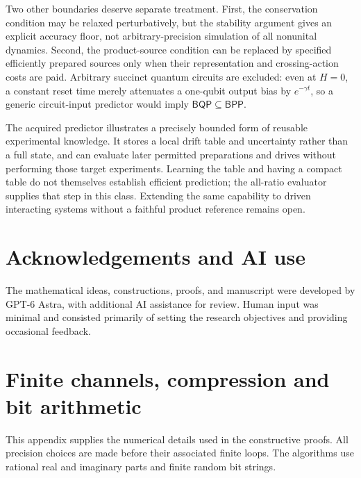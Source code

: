\documentclass[11pt,reqno]{amsart}
\numberwithin{equation}{section}
\theoremstyle{definition}
\theoremstyle{remark}
\begin{document}
Two other boundaries deserve separate treatment. First, the conservation condition may be relaxed perturbatively, but the stability argument gives an explicit accuracy floor, not arbitrary-precision simulation of all nonunital dynamics. Second, the product-source condition can be replaced by specified efficiently prepared sources only when their representation and crossing-action costs are paid. Arbitrary succinct quantum circuits are excluded: even at $H=0$, a constant reset time merely attenuates a one-qubit output bias by $e^{-\gamma t}$, so a generic circuit-input predictor would imply $\mathsf{BQP}\subseteq\mathsf{BPP}$.

The acquired predictor illustrates a precisely bounded form of reusable experimental knowledge. It stores a local drift table and uncertainty rather than a full state, and can evaluate later permitted preparations and drives without performing those target experiments. Learning the table and having a compact table do not themselves establish efficient prediction; the all-ratio evaluator supplies that step in this class. Extending the same capability to driven interacting systems without a faithful product reference remains open.


\section*{Acknowledgements and AI use}
The mathematical ideas, constructions, proofs, and manuscript were developed by GPT-6 Astra, with additional AI assistance for review. Human input was minimal and consisted primarily of setting the research objectives and providing occasional feedback.
\appendix
\section{Finite channels, compression and bit arithmetic}\label{app:arithmetic}

This appendix supplies the numerical details used in the constructive proofs. All precision choices are made before their associated finite loops. The algorithms use rational real and imaginary parts and finite random bit strings.
\end{document}
